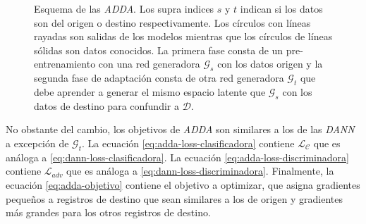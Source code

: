 \begin{figure}[H]
  \caption[Esquema de {\it ADDA}]{Esquema de las {\it ADDA}. Los supra indices $s$ y $t$ indican si los datos son del origen o destino respectivamente.
    Los círculos con líneas rayadas son salidas de los modelos mientras que los círculos de líneas sólidas son datos conocidos.
    La primera fase consta de un pre-entrenamiento con una red generadora $\mathcal{G}_s$ con los datos origen y la segunda fase de adaptación
    consta de otra red generadora $\mathcal{G}_t$ que debe aprender a generar el mismo espacio latente que $\mathcal{G}_s$ con los datos de destino para confundir a $\mathcal{D}$.}
  \label{fig:adda-esquema}
\end{figure}

No obstante del cambio, los objetivos de {\it ADDA} son similares a los de las {\it DANN} a excepción de
$\mathcal{G}_t$. La ecuación \ref{eq:adda-loss-clasificadora} contiene $\mathcal{L}_\mathcal{C}$ que es análoga a
\ref{eq:dann-loss-clasificadora}. La ecuación \ref{eq:adda-loss-discriminadora} contiene $\mathcal{L}_{adv}$ que es
análoga a \ref{eq:dann-loss-discriminadora}. Finalmente, la ecuación \ref{eq:adda-objetivo} contiene el objetivo a
optimizar, que asigna gradientes pequeños a registros de destino que sean similares a los de origen y gradientes más
grandes para los otros registros de destino.


